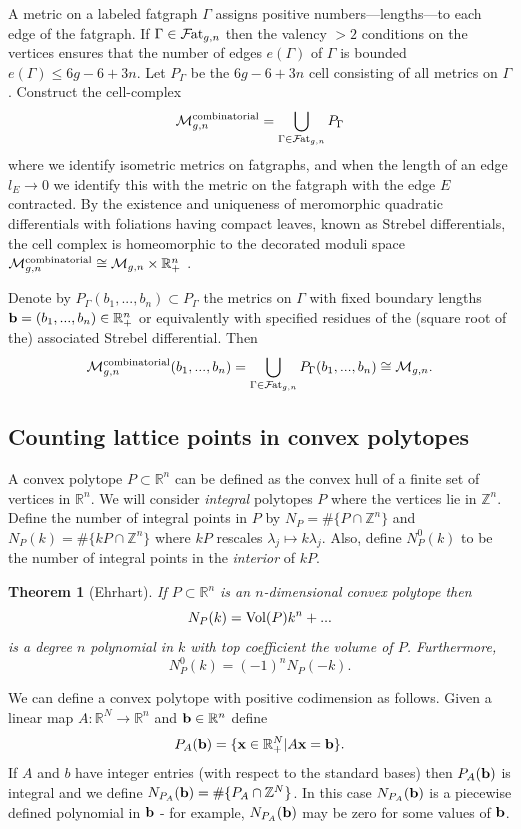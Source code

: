 \documentclass{amsart}
\newtheorem{thm}{Theorem}[section]
\newcommand{\br}{\mathbb{R}}
\newcommand{\bz}{\mathbb{Z}}
\newcommand{\modm}{\mathcal{M}}
\newcommand{\f}{\mathcal{F}}
\newcommand{\fat}{\f\hspace{-.3mm}{\rm at}_{g,n}}
\begin{document}
A metric on a labeled fatgraph $\Gamma$ assigns positive numbers---lengths---to each edge of the fatgraph.  If $\Gamma\in \fat$ then the valency $>2$ conditions on the vertices ensures that the number of edges $e(\Gamma)$ of $\Gamma$ is bounded $e(\Gamma)\leq 6g-6+3n$.  Let $P_{\Gamma}$ be the $6g-6+3n$ cell consisting of all metrics on $\Gamma$.  Construct the cell-complex 
\[ \modm_{g,n}^{\rm combinatorial}=\bigcup_{\Gamma\in \fat}P_{\Gamma}\]
where we identify isometric metrics on fatgraphs, and when the length of an edge $l_E\to 0$ we identify this with the metric on the fatgraph with the edge $E$ contracted.  By the existence and uniqueness of meromorphic quadratic differentials with foliations having compact leaves, known as Strebel differentials, the cell complex is homeomorphic to the decorated moduli space $\modm_{g,n}^{\rm combinatorial}\cong\modm_{g,n}\times\br_+^n$ \cite{HarVir}.

Denote by $P_{\Gamma}(b_1,...,b_n)\subset P_{\Gamma}$ the metrics on $\Gamma$ with fixed boundary lengths ${\bf b}=(b_1,...,b_n)\in\br_+^n$ or equivalently with specified residues of the (square root of the) associated Strebel differential.  Then 
\begin{equation}  \label{eq:modcom}
\modm_{g,n}^{\rm combinatorial}(b_1,...,b_n)=\bigcup_{\Gamma\in \fat}P_{\Gamma}(b_1,...,b_n)\cong\modm_{g,n}.
\end{equation} 

\subsection{Counting lattice points in convex polytopes}

A convex polytope $P\subset\br^n$ can be defined as the convex hull of a finite set of vertices in $\br^n$.  We will consider {\em integral} polytopes $P$ where the vertices lie in $\bz^n$.  Define the number of integral points in $P$ by $N_P=\#\{P\cap\bz^n\}$ and $N_P(k)=\#\{kP\cap\bz^n\}$ where $kP$ rescales $\lambda_j\mapsto k\lambda_j$.  Also, define $N^0_P(k)$ to be the number of integral points in the {\em interior} of $kP$.
\begin{thm}[Ehrhart]  \label{th:ehrh}
If $P\subset\br^n$ is an $n$-dimensional convex polytope then
\[ N_P(k)={\rm Vol}(P)k^n+...\] 
is a degree $n$ polynomial in $k$ with top coefficient the volume of $P$.  Furthermore,
\[ N^0_P(k)=(-1)^nN_P(-k).\]
\end{thm}

We can define a convex polytope with positive codimension as follows.  Given a linear map $A:\br^N\to\br^n$ and ${\bf b}\in\br^n$ define 
\[ P_A({\bf b})=\{{\bf x}\in\br_+^N|A{\bf x}={\bf b}\}.\]  
If $A$ and $b$ have integer entries (with respect to the standard bases) then $P_A({\bf b})$ is integral and we define $N_{P_A}({\bf b})=\#\{P_A\cap\bz^N\}$.  In this case $N_{P_A}({\bf b})$ is a piecewise defined polynomial in $\bf b$ - for example, $N_{P_A}({\bf b})$ may be zero for some values of ${\bf b}$.
\end{document}
